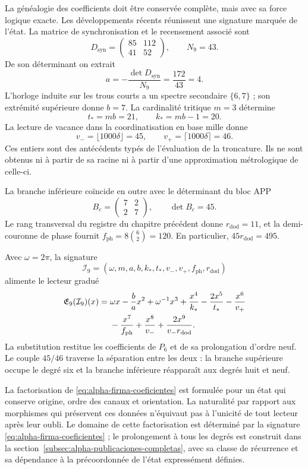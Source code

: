 La généalogie des coefficients doit être conservée complète, mais avec sa
force logique exacte. Les développements récents réunissent une signature marquée
de l'état. La matrice de synchronisation et le recensement associé sont
\[
 D_{\mathrm{syn}}=\begin{pmatrix}85&112\\41&52\end{pmatrix},
 \qquad N_9=43.
\]
De son déterminant on extrait
\[
 a=-\frac{\det D_{\mathrm{syn}}}{N_9}
   =\frac{172}{43}=4.
\]
L'horloge induite sur les trous courts a un spectre secondaire \(\{6,7\}\) ; son extrémité supérieure donne \(b=7\). La cardinalité tritique \(m=3\) détermine
\[
 t_*=mb=21,\qquad k_*=mb-1=20.
\]
La lecture de vacance dans la coordinatisation en base mille donne
\[
 v_-=\lfloor1000\delta\rfloor=45,\qquad
 v_+=\lceil1000\delta\rceil=46.
\]
Ces entiers sont des antécédents typés de l'évaluation de la troncature. Ils ne sont obtenus ni à partir de sa racine ni à partir d'une approximation métrologique de celle-ci.

La branche inférieure coïncide en outre avec le déterminant du bloc APP
\[
 B_c=\begin{pmatrix}7&2\\2&7\end{pmatrix},\qquad\det B_c=45.
\]
Le rang transversal du registre du chapitre précédent donne
\(r_{\mathrm{dod}}=11\), et la demi-couronne de phase fournit
\(f_{\mathrm{ph}}=8\binom62=120\). En particulier,
\(45r_{\mathrm{dod}}=495\).

Avec \(\omega=2\pi\), la signature
\[
 \mathcal I_9=(\omega,m,a,b,k_*,t_*,v_-,v_+,f_{\mathrm{ph}},r_{\mathrm{dod}})
\]
alimente le lecteur gradué
\begin{align}
 \mathfrak E_9(\mathcal I_9)(x)
 ={}&\omega x-\frac ba x^2+\omega^{-1}x^3
 +\frac{x^4}{k_*}-\frac{2x^5}{t_*}-\frac{x^6}{v_+}\notag\\
 &-\frac{x^7}{f_{\mathrm{ph}}}+\frac{x^8}{v_-}
 +\frac{2x^9}{v_-r_{\mathrm{dod}}}.
 \label{eq:alpha-firma-coeficientes}
\end{align}
La substitution restitue les coefficients de \(P_6\) et de sa
prolongation d'ordre neuf. Le couple \(45/46\) traverse la séparation
entre les deux : la branche supérieure occupe le degré six et la branche inférieure réapparaît
aux degrés huit et neuf.

La factorisation de \eqref{eq:alpha-firma-coeficientes} est formulée
pour un état qui conserve origine, ordre des canaux et orientation. La
naturalité par rapport aux morphismes qui préservent ces données n’équivaut pas à
l’unicité de tout lecteur après leur oubli. Le domaine de cette
factorisation est déterminé par la signature
\eqref{eq:alpha-firma-coeficientes} ; le prolongement à tous les degrés
est construit dans la section~\ref{subsec:alpha-publicaciones-completas},
avec sa classe de récurrence et sa dépendance à la précoordonnée de l’état
expressément définies.

